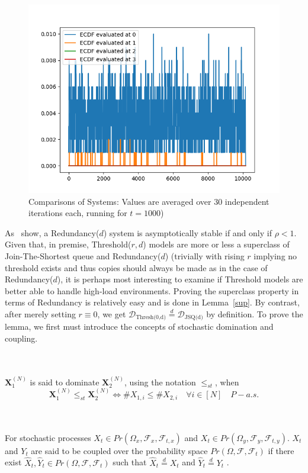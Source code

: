 \begin{figure}
    \centering
    \includegraphics[width=0.7\linewidth]{attimes} %
    \caption{Comparisons of Systems: Values are averaged over 30 independent iterations each, running for $t=1000$)}
    \label{fig:img}
\end{figure}

As~\cite{gardner_redundancy-d_2017} show, a Redundancy($d$) system is asymptotically stable if and only if $\rho < 1 $. Given that, in premise, Threshold($r,d$) models are more or less a superclass of Join-The-Shortest queue and Redundancy($d$) (trivially with rising $r$  implying no threshold exists and thus copies should always be made as in the case of Redundancy($d$), it is perhaps most interesting to examine if Threshold models are better able to handle high-load environments. Proving the superclass property in terms of Redundancy is relatively easy and is done in Lemma~\ref{sup}. By contrast, after merely setting $r \equiv 0$, we get $ \mathcal{D}_{\text{Thresh(0,d)}} \overset{d}{=} \mathcal{D}_{\text{JSQ(d)}}$ by definition. To prove the lemma, we first must introduce the concepts of stochastic domination and coupling.
\begin{definition}
    \\~\\
    $\mathbf{X}_{1}^{(N)}$ is said to dominate $\mathbf{X}_{2}^{(N)}$, using the notation $\leq_{st}$, when ~\cite{bramson_asymptotic_2012}
    \[\mathbf{X}_{1}^{(N)}\leq_{st}\mathbf{X}_{2}^{(N)} \iff\# X_{1,i} \leq \# X_{2,i}  \quad \forall i \in [N] \quad P-a.s.\]
\end{definition}

\begin{definition}
    \label{coupled}
    \\~\\
    For stochastic processes $X_{t} \in Pr(\Omega_{x}, \mathcal{F}_{x}, \mathcal{F}_{t,x})$ and $X_{t} \in Pr(\Omega_{y}, \mathcal{F}_{y}, \mathcal{F}_{t,y})$.
    $X_{t}$ and $Y_{t}$ are said to be coupled over the probability space $Pr(\Omega, \mathcal{F}, \mathcal{F}_{t})$ if there exist
    $\hat X_{t}, \hat Y_{t} \in Pr(\Omega, \mathcal{F}, \mathcal{F}_{t})$ such that $\hat X_{t} \overset{d}{=}X_{t}$ and $\hat Y_{t} \overset{d}{=}Y_{t}$ \cite{bramson_asymptotic_2012}.
\end{definition}


